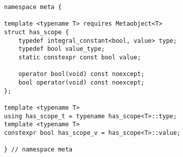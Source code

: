 
\begin{verbatim}
namespace meta {

template <typename T> requires Metaobject<T>
struct has_scope {
	typedef integral_constant<bool, value> type;
	typedef bool value_type;
	static constexpr const bool value;

	operator bool(void) const noexcept;
	bool operator(void) const noexcept;
};

template <typename T>
using has_scope_t = typename has_scope<T>::type;
template <typename T>
constexpr bool has_scope_v = has_scope<T>::value;

} // namespace meta
\end{verbatim}
